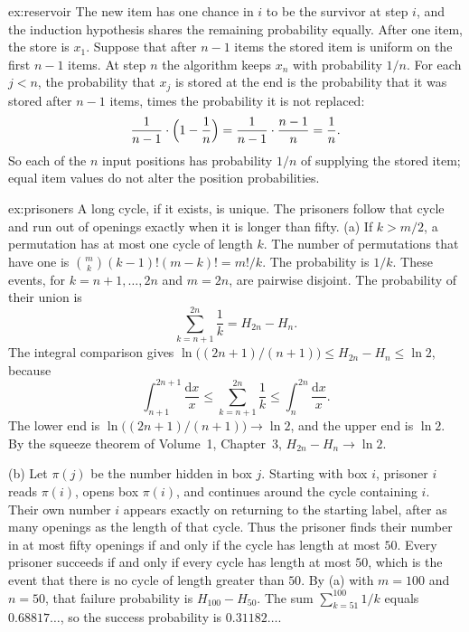 \begin{solution}{ex:reservoir}
\idea The new item has one chance in $i$ to be the survivor at step $i$, and the induction hypothesis shares the remaining probability equally.
\writeup After one item, the store is $x_1$. Suppose that after $n-1$ items the stored item is uniform on the first $n-1$ items. At step $n$ the algorithm keeps $x_n$ with probability $1/n$. For each $j<n$, the probability that $x_j$ is stored at the end is the probability that it was stored after $n-1$ items, times the probability it is not replaced:
\[
 \frac1{n-1}\cdot\Bigl(1-\frac1n\Bigr)=\frac1{n-1}\cdot\frac{n-1}n=\frac1n.
\]
So each of the $n$ input positions has probability $1/n$ of supplying the stored item; equal item values do not alter the position probabilities.
\end{solution}

\begin{solution}{ex:prisoners}
\idea A long cycle, if it exists, is unique. The prisoners follow that cycle and run out of openings exactly when it is longer than fifty.
\writeup (a) If $k>m/2$, a permutation has at most one cycle of length $k$. The number of permutations that have one is $\binom{m}{k}(k-1)!(m-k)!=m!/k$. The probability is $1/k$. These events, for $k=n+1,\ldots,2n$ and $m=2n$, are pairwise disjoint. The probability of their union is
\[
 \sum_{k=n+1}^{2n}\frac1k=H_{2n}-H_n.
\]
The integral comparison gives $\ln\bigl((2n+1)/(n+1)\bigr)\le H_{2n}-H_n\le\ln2$, because
\[
 \int_{n+1}^{2n+1}\frac{\mathrm dx}x\le\sum_{k=n+1}^{2n}\frac1k\le\int_n^{2n}\frac{\mathrm dx}x.
\]
The lower end is $\ln\bigl((2n+1)/(n+1)\bigr)\to\ln2$, and the upper end is $\ln2$. By the squeeze theorem of Volume~1, Chapter~3, $H_{2n}-H_n\to\ln2$.

(b) Let $\pi(j)$ be the number hidden in box $j$. Starting with box $i$, prisoner $i$ reads $\pi(i)$, opens box $\pi(i)$, and continues around the cycle containing $i$. Their own number $i$ appears exactly on returning to the starting label, after as many openings as the length of that cycle. Thus the prisoner finds their number in at most fifty openings if and only if the cycle has length at most $50$. Every prisoner succeeds if and only if every cycle has length at most $50$, which is the event that there is no cycle of length greater than $50$. By (a) with $m=100$ and $n=50$, that failure probability is $H_{100}-H_{50}$. The sum $\sum_{k=51}^{100}1/k$ equals $0.68817\ldots$, so the success probability is $0.31182\ldots$.
\end{solution}

